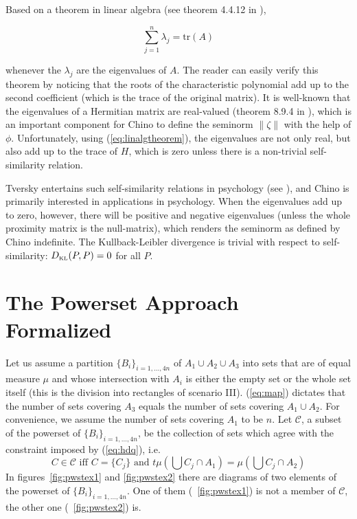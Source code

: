 \documentclass[phd,12pt,oneside]{ubcthesis}
\begin{document}
Based on a theorem in linear algebra (see theorem 4.4.12 in
),

\begin{equation}
  \label{eq:linalgtheorem}
    \sum_{j=1}^{n}\lambda_{j}=\mbox{tr}(A)
\end{equation}

{\noindent}whenever the $\lambda_{j}$ are the eigenvalues of $A$. The reader can
easily verify this theorem by noticing that the roots of the
characteristic polynomial add up to the second coefficient (which is
the trace of the original matrix). It is well-known that the
eigenvalues of a Hermitian matrix are real-valued (theorem 8.9.4 in
), which is an important component for Chino
to define the seminorm $\|\zeta\|$ with the help of $\phi$.
Unfortunately, using (\ref{eq:linalgtheorem}), the eigenvalues are not
only real, but also add up to the trace of $H$, which is zero unless
there is a non-trivial self-similarity relation.

Tversky entertains such self-similarity relations in psychology (see
), and Chino is primarily interested in
applications in psychology. When the eigenvalues add up to zero,
however, there will be positive and negative eigenvalues (unless the
whole proximity matrix is the null-matrix), which renders the seminorm
as defined by Chino indefinite. The Kullback-Leibler divergence is
trivial with respect to self-similarity: $D_{\mbox{\tiny KL}}(P,P)=0$
for all $P$.

\chapter{The Powerset Approach Formalized}
\label{app:kiiwivul}

Let us assume a partition $\{B_{i}\}_{i=1,{\ldots},4n}$ of
$A_{1}\cup{}A_{2}\cup{}A_{3}$ into sets that are of equal measure
$\mu$ and whose intersection with $A_{i}$ is either the empty set or
the whole set itself (this is the division into rectangles of scenario
III). ({\ref{eq:map}}) dictates that the number of sets covering
$A_{3}$ equals the number of sets covering $A_{1}\cup{}A_{2}$. For
convenience, we assume the number of sets covering $A_{1}$ to be $n$.
Let $\mathcal{C}$, a subset of the powerset of
$\{B_{i}\}_{i=1,{\ldots},4n}$, be the collection of sets which agree
with the constraint imposed by ({\ref{eq:hdq}}), i.e.\
\begin{equation}
  \label{eq:iengiebu}
  C\in\mathcal{C}\mbox{ iff }C=\{C_{j}\}\mbox{ and }t\mu\left(\bigcup{}C_{j}\cap{}A_{1}\right)=\mu\left(\bigcup{}C_{j}\cap{}A_{2}\right)
\end{equation}
In figures~\ref{fig:pwstex1} and \ref{fig:pwstex2} there are diagrams
of two elements of the powerset of $\{B_{i}\}_{i=1,{\ldots},4n}$. One
of them ({\igure}~\ref{fig:pwstex1}) is not a member of $\mathcal{C}$,
the other one ({\igure}~\ref{fig:pwstex2}) is.
\end{document}
